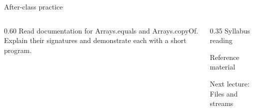 \documentclass[10pt,aspectratio=169]{beamer}
\begin{document}
\begin{frame}[fragile,t]{After-class practice}
\begin{columns}[T,onlytextwidth]\begin{column}{0.60\textwidth}
Read documentation for Arrays.equals and Arrays.copyOf. Explain their signatures and demonstrate each with a short program.
\end{column}\begin{column}{0.35\textwidth}\small
Syllabus reading\par Reference material

Next lecture: Files and streams
\end{column}\end{columns}
\end{frame}
\end{document}
